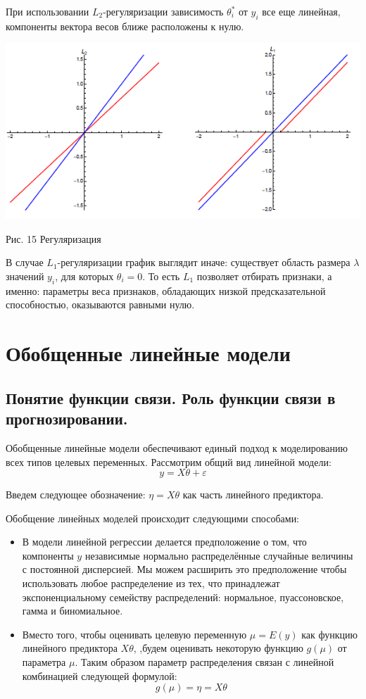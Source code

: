 \documentclass[aps,%
12pt,%
final,%
oneside,
onecolumn,%
musixtex, %
superscriptaddress,%
centertags]{article} %
\theoremstyle{plain}
\theoremstyle{definition}
\theoremstyle{remark}
\begin{document}
При использовании $L_2$-регуляризации зависимость $\theta_i^*$ от $y_i$ все еще линейная, компоненты вектора весов ближе расположены к нулю.

\begin{center}
	\includegraphics[scale=0.5]{images/16.png}

	Рис. 15 Регуляризация
\end{center}

В случае $L_1$-регуляризации график выглядит иначе: существует область размера $\lambda$ значений $y_i$, для которых $\theta_i = 0$. То есть $L_1$ позволяет отбирать признаки, а именно: параметры веса признаков, обладающих низкой предсказательной способностью, оказываются равными нулю.

\newpage
\section{Обобщенные линейные модели}

\subsection{Понятие функции связи. Роль функции связи в прогнозировании.}

Обобщенные линейные модели обеспечивают единый подход к моделированию всех типов целевых переменных. Рассмотрим общий вид линейной модели:
$$y = X\theta + \varepsilon$$

Введем следующее обозначение: $\eta = X\theta$ как часть линейного предиктора.

Обобщение линейных моделей происходит следующими способами:

\begin{itemize}
	\item В модели линейной регрессии делается предположение о том, что компоненты $y$ независимые нормально распределённые случайные величины с постоянной дисперсией. Мы можем расширить это предположение чтобы использовать любое распределение из тех, что принадлежат экспоненциальному семейству распределений: нормальное, пуассоновское, гамма и биномиальное.
	\item Вместо того, чтобы оценивать целевую переменную $\mu = E(y)$ как функцию линейного предиктора $X\theta$, ,будем оценивать некоторую функцию $g(\mu)$ от параметра $\mu$. Таким образом параметр распределения связан с линейной комбинацией следующей формулой:
	$$g(\mu) = \eta = X\theta$$
\end{itemize}
\end{document}
